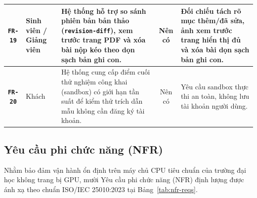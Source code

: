 {\begin{longtable}{|C{0.10}|L{0.16}|L{0.38}|C{0.11}|L{0.25}|}
\hline
\textbf{\texttt{FR-19}} & Sinh viên / Giảng viên & Hệ thống hỗ trợ so sánh phiên bản bản thảo (\texttt{revision-diff}), xem trước trang PDF và xóa bài nộp kéo theo dọn sạch bản ghi con. & Nên có & Đối chiếu tách rõ mục thêm/đã sửa, ảnh xem trước trang hiển thị đủ và xóa bài dọn sạch bản ghi con. \\
\hline
\textbf{\texttt{FR-20}} & Khách & Hệ thống cung cấp điểm cuối thử nghiệm công khai (sandbox) có giới hạn tần suất để kiểm thử trích dẫn mẫu không cần đăng ký tài khoản. & Nên có & Yêu cầu sandbox thực thi an toàn, không lưu tài khoản người dùng. \\
\hline
\end{longtable}
}

\subsection{Yêu cầu phi chức năng (NFR)}

Nhằm bảo đảm vận hành ổn định trên máy chủ CPU tiêu chuẩn của trường đại học không trang bị GPU, mười Yêu cầu phi chức năng (NFR) định lượng được ánh xạ theo chuẩn ISO/IEC 25010:2023 tại Bảng~\ref{tab:nfr-reqs}.

